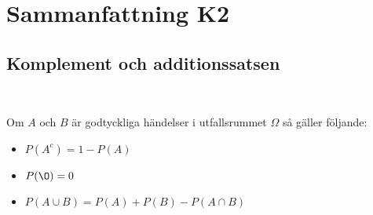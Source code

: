 \section{Sammanfattning K2}
\subsection{Komplement och additionssatsen}\hfill\\\par
\noindent Om $A$ och $B$ är godtyckliga händelser i utfallsrummet $\Omega$ så gäller följande:\par
\begin{itemize}
  \item $P(A^c)=1-P(A)$
  \item $P(\O)=0$
  \item $P(A\cup B) = P(A)+P(B)-P(A\cap B)$
\end{itemize}\par
